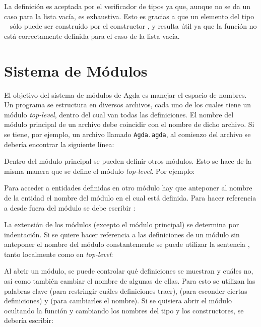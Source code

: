 
La definición es aceptada por el verificador de tipos ya que, aunque no se da un caso para la lista vacía, es exhaustiva. Esto es gracias a que un elemento del tipo \mbox{  \AgdaSymbol{(} \AgdaSymbol{)}} sólo puede ser construído por el constructor \AgdaFunction{\_::\_}, y resulta útil ya que la función  no está correctamente definida para el caso de la lista vacía.  

\section{Sistema de Módulos}\label{agda:modules}

El objetivo del sistema de módulos de Agda es manejar el espacio de nombres. Un programa se estructura en diversos archivos, cada uno de los cuales tiene un módulo \textit{top-level}, dentro del cual van todas las definiciones. El nombre del módulo principal de un archivo debe coincidir con el nombre de dicho archivo. Si se tiene, por ejemplo, un archivo llamado \texttt{Agda.agda}, al comienzo del archivo se debería encontrar la siguiente línea:


Dentro del módulo principal se pueden definir otros módulos. Esto se hace de la misma manera que se define el módulo \textit{top-level}. Por ejemplo:


Para acceder a entidades definidas en otro módulo hay que anteponer al nombre de la entidad el nombre del módulo en el cual está definida. Para hacer referencia a  desde fuera del módulo  se debe escribir :




La extensión de los módulos (excepto el módulo principal) se determina por indentación. Si se quiere hacer referencia a las definiciones de un módulo sin anteponer el nombre del módulo constantemente se puede utilizar la sentencia , tanto localmente como en \textit{top-level}:






Al abrir un módulo, se puede controlar qué definiciones se muestran y cuáles no, así como también cambiar el nombre de algunas de ellas. Para esto se utilizan las palabras clave  (para restringir cuáles definiciones traer),  (para esconder ciertas definiciones) y  (para cambiarles el nombre). Si se quisiera abrir el módulo  ocultando la función  y cambiando los nombres del tipo y los constructores, se debería escribir:

